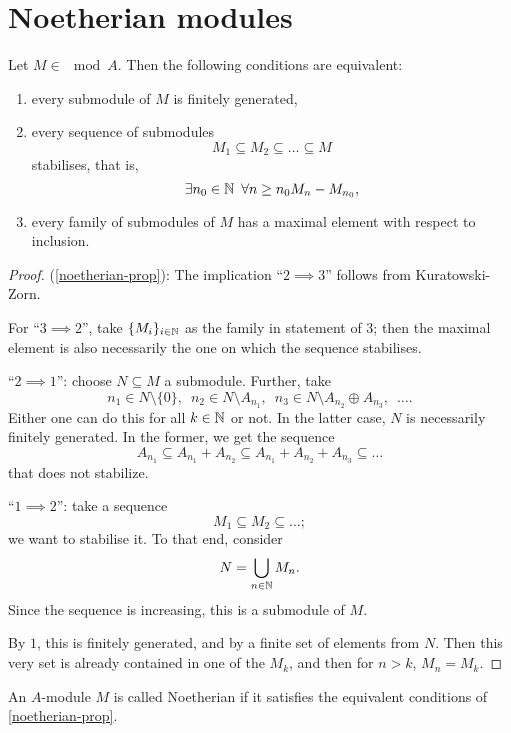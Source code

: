 \section{Noetherian modules}
\begin{prop}
  \label{noetherian-prop}
  Let $M \in \mod{A}$. Then the following conditions are equivalent:
  \begin{enumerate}
  \item every submodule of $M$ is finitely generated,
  \item every sequence of submodules
    \[ M_1 \subseteq M_2 \subseteq \ldots \subseteq M\]
    stabilises, that is,
    \[ \exists n_0 \in \mathbb N \enspace \forall n \geq n_0 M_n - M_{n_0},\]
  \item every family of submodules of $M$ has a maximal element with respect to inclusion.
  \end{enumerate}
\end{prop}

\begin{proof} (\cref{noetherian-prop}):
  The implication ``$2 \implies 3$'' follows from Kuratowski-Zorn.

  For ``$3 \implies 2$'', take $\{ M_i \}_{i \in \mathbb N}$ as the family in statement of 3; then the maximal element is also necessarily the one on which the sequence stabilises.

  ``$ 2 \implies 1$'': choose $N \subseteq M$ a submodule. Further, take
  \[ n_1 \in N \setminus \{ 0 \}, \enspace n_2 \in N \setminus A_{n_1}, \enspace n_3 \in N \setminus A_{n_2} \oplus A_{n_3}, \enspace \ldots.\]
  Either one can do this for all $k \in \mathbb N$ or not. In the latter case, $N$ is necessarily finitely generated. In the former, we get the sequence
  \[ A_{n_1} \subseteq A_{n_1} + A_{n_2} \subseteq A_{n_1} + A_{n_2} + A_{n_3} \subseteq \ldots \]
  that does not stabilize.

  ``$1 \implies 2$'': take a sequence
  \[ M_1 \subseteq M_2 \subseteq \ldots;\]
  we want to stabilise it. To that end, consider
  \[ N = \bigcup_{n \in \mathbb N} M_n.\]
  Since the sequence is increasing, this is a submodule of $M$.
  
  By $1$, this is finitely generated, and by a finite set of elements from $N$. Then this very set is already contained in one of the $M_k$, and then for $n > k$, $M_n = M_k$.
\end{proof}

\begin{df}
  An $A$-module $M$ is called Noetherian if it satisfies the equivalent conditions of \cref{noetherian-prop}.
\end{df}


